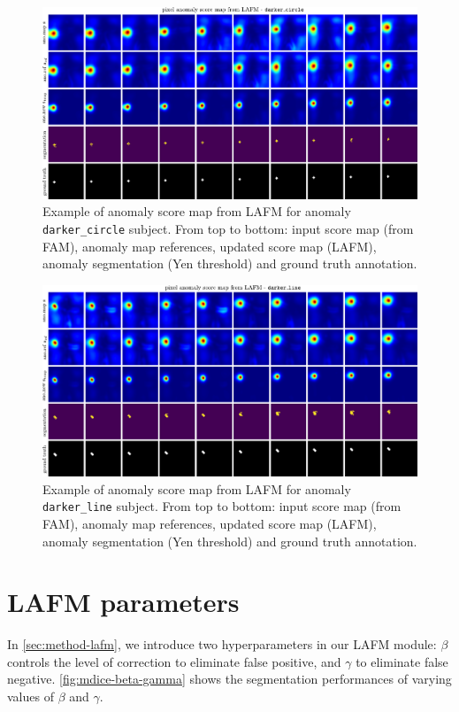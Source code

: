 \begin{figure}[htbp]
  \centering
  \includegraphics[width=0.75\linewidth]{figures/app-lafm-darkercircle.pdf}
  \caption[Example: anomaly segmentation from LAFM - \texttt{darker\_circle}]{Example of anomaly score map from LAFM for anomaly \texttt{darker\_circle} subject. From top to bottom: input score map (from FAM), anomaly map references, updated score map (LAFM), anomaly segmentation (Yen threshold) and ground truth annotation.}
\end{figure}

\begin{figure}[htbp]
  \centering
  \includegraphics[width=0.75\linewidth]{figures/app-lafm-darkerline.pdf}
  \caption[Example: anomaly segmentation from LAFM - \texttt{darker\_line}]{Example of anomaly score map from LAFM for anomaly \texttt{darker\_line} subject. From top to bottom: input score map (from FAM), anomaly map references, updated score map (LAFM), anomaly segmentation (Yen threshold) and ground truth annotation.}
\end{figure}

\section{LAFM parameters}
In \cref{sec:method-lafm}, we introduce two hyperparameters in our LAFM module: $\beta$ controls the level of correction to eliminate false positive, and $\gamma$ to eliminate false negative. \cref{fig:mdice-beta-gamma} shows the segmentation performances of varying values of $\beta$ and $\gamma$.

